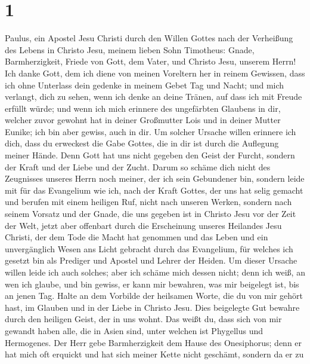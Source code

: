 \hypertarget{section}{%
\section{1}\label{section}}

 Paulus, ein Apostel Jesu Christi durch den Willen Gottes
nach der Verheißung des Lebens in Christo Jesu,  meinem
lieben Sohn Timotheus: Gnade, Barmherzigkeit, Friede von Gott, dem
Vater, und Christo Jesu, unserem Herrn!  Ich danke Gott, dem
ich diene von meinen Voreltern her in reinem Gewissen, dass ich ohne
Unterlass dein gedenke in meinem Gebet Tag und Nacht;  und
mich verlangt, dich zu sehen, wenn ich denke an deine Tränen, auf dass
ich mit Freude erfüllt würde;  und wenn ich mich erinnere
des ungefärbten Glaubens in dir, welcher zuvor gewohnt hat in deiner
Großmutter Lois und in deiner Mutter Eunike; ich bin aber gewiss, auch
in dir.  Um solcher Ursache willen erinnere ich dich, dass
du erweckest die Gabe Gottes, die in dir ist durch die Auflegung meiner
Hände.  Denn Gott hat uns nicht gegeben den Geist der
Furcht, sondern der Kraft und der Liebe und der Zucht. 
Darum so schäme dich nicht des Zeugnisses unseres Herrn noch meiner, der
ich sein Gebundener bin, sondern leide mit für das Evangelium wie ich,
nach der Kraft Gottes,  der uns hat selig gemacht und
berufen mit einem heiligen Ruf, nicht nach unseren Werken, sondern nach
seinem Vorsatz und der Gnade, die uns gegeben ist in Christo Jesu vor
der Zeit der Welt,  jetzt aber offenbart durch die
Erscheinung unseres Heilandes Jesu Christi, der dem Tode die Macht hat
genommen und das Leben und ein unvergänglich Wesen ans Licht gebracht
durch das Evangelium,  für welches ich gesetzt bin als
Prediger und Apostel und Lehrer der Heiden.  Um dieser
Ursache willen leide ich auch solches; aber ich schäme mich dessen
nicht; denn ich weiß, an wen ich glaube, und bin gewiss, er kann mir
bewahren, was mir beigelegt ist, bis an jenen Tag.  Halte
an dem Vorbilde der heilsamen Worte, die du von mir gehört hast, im
Glauben und in der Liebe in Christo Jesu.  Dies beigelegte
Gut bewahre durch den heiligen Geist, der in uns wohnt. 
Das weißt du, dass sich von mir gewandt haben alle, die in Asien sind,
unter welchen ist Phygellus und Hermogenes.  Der Herr gebe
Barmherzigkeit dem Hause des Onesiphorus; denn er hat mich oft erquickt
und hat sich meiner Kette nicht geschämt,  sondern da er zu
